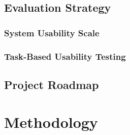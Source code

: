 \section{Evaluation Strategy}
\label{sec:method-evaluation}

\subsection{System Usability Scale}
\label{subsec:method-sus}

\subsection{Task-Based Usability Testing}
\label{subsec:method-tasks}

\section{Project Roadmap}
\label{sec:method-roadmap}


\chapter{Methodology}



